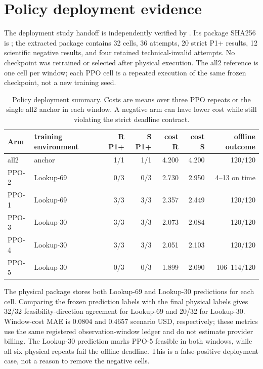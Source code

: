 \section{Policy deployment evidence}
\label{app:e2policy}
The deployment study handoff is independently verified by
. Its package SHA256 is
;
the extracted package contains 32 cells, 36 attempts, 20 strict P1+ results,
12 scientific negative results, and four retained technical-invalid attempts.
No checkpoint was retrained or selected after physical execution. The all2
reference is one cell per window; each PPO cell is a repeated execution of the
same frozen checkpoint, not a new training seed.

\begin{table}[t]
\centering
\small
\caption{Policy deployment summary. Costs are means over three PPO repeats or
the single all2 anchor in each window. A negative arm can have lower cost while
still violating the strict deadline contract.}
\label{tab:e2appendix}
\setlength{\tabcolsep}{5pt}
\par\vspace{4pt}
\begin{tabular*}{0.92\linewidth}{@{\extracolsep{\fill}}llrrrrr@{}}
\toprule
Arm & training environment & R P1+ & S P1+ & cost R & cost S & offline outcome\\
\midrule
all2 & anchor & 1/1 & 1/1 & 4.200 & 4.200 & 120/120\\
PPO-2 & Lookup-69 & 0/3 & 0/3 & 2.730 & 2.950 & 4--13 on time\\
PPO-1 & Lookup-69 & 3/3 & 3/3 & 2.357 & 2.449 & 120/120\\
PPO-3 & Lookup-30 & 3/3 & 3/3 & 2.073 & 2.084 & 120/120\\
PPO-4 & Lookup-30 & 3/3 & 3/3 & 2.051 & 2.103 & 120/120\\
PPO-5 & Lookup-30 & 0/3 & 0/3 & 1.899 & 2.090 & 106--114/120\\
\bottomrule
\end{tabular*}
\end{table}

The physical package stores both Lookup-69 and Lookup-30 predictions for each cell. Comparing
the frozen prediction labels with the final physical labels gives 32/32
feasibility-direction agreement for Lookup-69 and 20/32 for Lookup-30. Window-cost MAE is
0.0804 and 0.4657 scenario USD, respectively; these metrics use the same
registered observation-window ledger and do not estimate provider billing.
The Lookup-30 prediction marks PPO-5 feasible in both windows, while all six
physical repeats fail the offline deadline. This is a false-positive deployment
case, not a reason to remove the negative cells.


